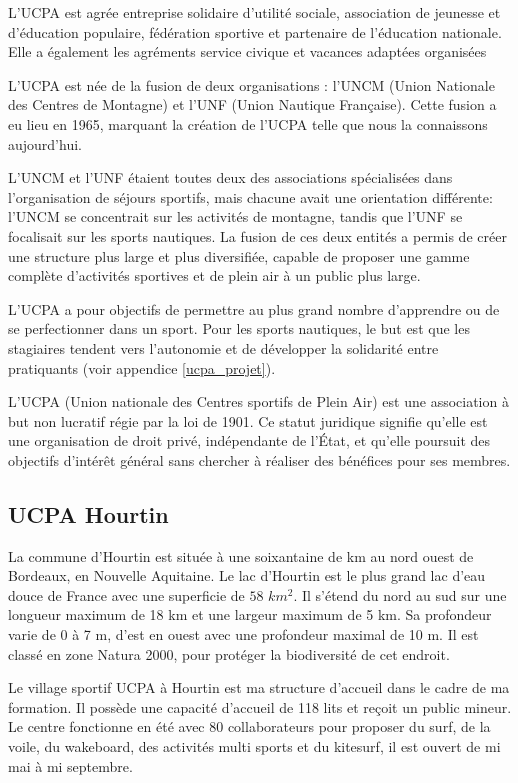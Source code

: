 \documentclass[11pt,a4paper]{report}
\begin{document}
L’UCPA est agrée entreprise solidaire d’utilité sociale, association de
jeunesse et d’éducation populaire, fédération sportive et partenaire de 
l’éducation nationale. Elle a également les agréments service civique et
vacances adaptées organisées

L'UCPA est  née de la fusion de deux organisations : l'UNCM 
(Union Nationale des Centres de Montagne)
et l'UNF (Union Nautique Française). Cette fusion a eu lieu en
1965, marquant la création de l'UCPA telle que nous la connaissons
aujourd'hui.

L'UNCM et l'UNF étaient toutes deux des associations spécialisées
dans l'organisation de séjours sportifs, mais chacune avait une
orientation différente: l'UNCM se concentrait sur les activités 
de montagne, tandis que l'UNF se focalisait sur les sports nautiques. 
La fusion de ces deux entités a permis de créer une structure plus 
large et plus diversifiée, capable de proposer une gamme complète 
d'activités sportives et de plein air à un public plus large.

L'UCPA a pour objectifs de permettre au plus grand nombre
d'apprendre ou de se perfectionner dans un sport.
Pour les sports nautiques, le but est que les stagiaires
tendent vers l'autonomie  et de développer la solidarité entre
pratiquants (voir appendice \ref{ucpa_projet}).


L'UCPA (Union nationale des Centres sportifs de Plein Air) est 
une association à but non lucratif régie par la loi de 1901. 
Ce statut juridique signifie qu'elle est une organisation de
droit privé, indépendante de l'État, et qu'elle poursuit des
objectifs d'intérêt général sans chercher à  réaliser des
bénéfices pour ses membres.

\subsection{UCPA Hourtin}
La commune d'Hourtin est située à une soixantaine de km au nord ouest 
de Bordeaux, en Nouvelle Aquitaine. Le lac d'Hourtin est le plus grand
lac d'eau douce de France avec une superficie de $58 \,\,km^2$.
Il s'étend du nord au sud sur une longueur maximum de 18 km 
et une largeur maximum de 5 km. Sa profondeur varie de 0 à 7 m, 
d'est en ouest avec une profondeur maximal de 10 m.
Il est classé en zone Natura 2000\cite{natura2000}, 
pour protéger la biodiversité de cet endroit.

Le village sportif UCPA à Hourtin est ma structure d'accueil dans le cadre de
ma formation. Il possède une capacité d'accueil de 118 lits et reçoit un 
public mineur. Le centre fonctionne en été avec 80 collaborateurs pour
proposer du surf, de la voile, du wakeboard, des activités multi sports
et du kitesurf, il est ouvert de mi mai à mi septembre.
 
\end{document}
